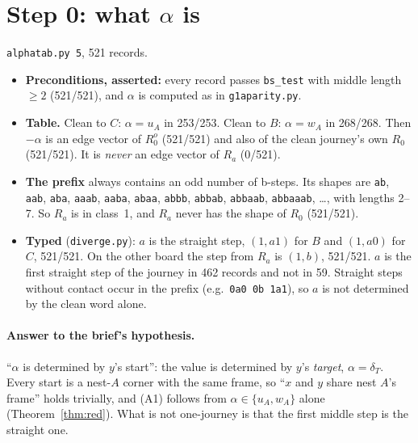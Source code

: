 \documentclass[11pt]{article}
\theoremstyle{definition}\newtheorem{definition}[theorem]{Definition}\newtheorem{remark}[theorem]{Remark}
\begin{document}
\section{Step 0: what $\alpha$ is}\label{sec:step0}
\texttt{alphatab.py 5}, 521 records.
\begin{itemize}
\item \textbf{Preconditions, asserted:} every record passes \texttt{bs\_test} with middle length $\ge2$ (521/521), and $\alpha$ is computed as in \texttt{g1aparity.py}.
\item \textbf{Table.} Clean to $C$: $\alpha=u_A$ in 253/253. Clean to $B$: $\alpha=w_A$ in 268/268. Then $-\alpha$ is an edge vector of $R_0^o$ (521/521) and also of the clean journey's own $R_0$ (521/521). It is \emph{never} an edge vector of $R_a$ (0/521).
\item \textbf{The prefix} always contains an odd number of b-steps. Its shapes are \texttt{ab}, \texttt{aab}, \texttt{aba}, \texttt{aaab}, \texttt{aaba}, \texttt{abaa}, \texttt{abbb}, \texttt{abbab}, \texttt{abbaab}, \texttt{abbaaab}, \dots, with lengths 2--7. So $R_a$ is in class~1, and $R_a$ never has the shape of $R_0$ (521/521).
\item \textbf{Typed} (\texttt{diverge.py}): $a$ is the straight step, $(1,a1)$ for $B$ and $(1,a0)$ for $C$, 521/521. On the other board the step from $R_a$ is $(1,b)$, 521/521.
$a$ is the first straight step of the journey in 462 records and not in 59. Straight steps without contact occur in the prefix (e.g.\ \texttt{0a0 0b 1a1}), so $a$ is not determined by the clean word alone.
\end{itemize}
\paragraph{Answer to the brief's hypothesis.} ``$\alpha$ is determined by $y$'s start'': the value is determined by $y$'s \emph{target}, $\alpha=\delta_T$. Every start is a nest-$A$ corner with the same frame, so ``$x$ and $y$ share nest $A$'s frame'' holds trivially, and (A1) follows from $\alpha\in\{u_A,w_A\}$ alone (Theorem~\ref{thm:red}). What is not one-journey is that the first middle step is the straight one.
\end{document}
